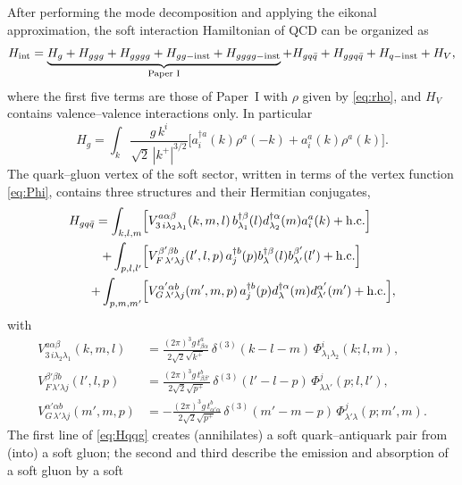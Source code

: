 \documentclass[11pt,a4paper]{article}
\numberwithin{equation}{section}
\newcommand{\dg}{\dagger}
\newcommand{\dthree}{\delta^{(3)}}
\newcommand{\Ph}{\Phi}
\begin{document}
After performing the mode decomposition and applying the eikonal approximation, the soft
interaction Hamiltonian of QCD can be organized as
\begin{equation}
H_{\rm int}=\underbrace{H_{g}+H_{ggg}+H_{gggg}+H_{gg-{\rm inst}}+H_{gggg-{\rm inst}}}_{\text{Paper~I}}
+H_{gq\bar q}+H_{ggq\bar q}+H_{q-{\rm inst}}+H_{V},
\label{eq:Hint}
\end{equation}
where the first five terms are those of Paper~I with $\rho$ given by \eqref{eq:rho}, and $H_{V}$
contains valence--valence interactions only. In particular
\begin{equation}
H_{g}=\int_{k}\frac{g\,k^{i}}{\sqrt2\,|k^{+}|^{3/2}}
\Big[a^{\dg a}_{i}(k)\rho^{a}(-k)+a^{a}_{i}(k)\rho^{a}(k)\Big].
\label{eq:Hg}
\end{equation}
The quark--gluon vertex of the soft sector, written in terms of the vertex function
\eqref{eq:Phi}, contains three structures and their Hermitian conjugates,
\begin{align}
H_{gq\bar q}=\int_{k,l,m}&\Big[V^{a\alpha\beta}_{3\,i\lambda_{2}\lambda_{1}}(k,m,l)\,
b^{\dg\beta}_{\lambda_{1}}(l)d^{\dg\alpha}_{\lambda_{2}}(m)a^{a}_{i}(k)+{\rm h.c.}\Big]
\nonumber\\
+\int_{p,l,l'}&\Big[V^{\beta'\beta b}_{F\,\lambda'\lambda j}(l',l,p)\,
a^{\dg b}_{j}(p)b^{\dg\beta}_{\lambda}(l)b^{\beta'}_{\lambda'}(l')+{\rm h.c.}\Big]
\nonumber\\
+\int_{p,m,m'}&\Big[V^{\alpha'\alpha b}_{G\,\lambda'\lambda j}(m',m,p)\,
a^{\dg b}_{j}(p)d^{\dg\alpha}_{\lambda}(m)d^{\alpha'}_{\lambda'}(m')+{\rm h.c.}\Big],
\label{eq:Hqqg}
\end{align}
with
\begin{align}
V^{a\alpha\beta}_{3\,i\lambda_{2}\lambda_{1}}(k,m,l)&=\frac{(2\pi)^{3}g\,t^{a}_{\beta\alpha}}{2\sqrt2\sqrt{k^{+}}}\,
\dthree(k-l-m)\,\Ph^{i}_{\lambda_{1}\lambda_{2}}(k;l,m),
\label{eq:V3}\\
V^{\beta'\beta b}_{F\,\lambda'\lambda j}(l',l,p)&=\frac{(2\pi)^{3}g\,t^{b}_{\beta\beta'}}{2\sqrt2\sqrt{p^{+}}}\,
\dthree(l'-l-p)\,\Ph^{j}_{\lambda\lambda'}(p;l,l'),
\label{eq:VF}\\
V^{\alpha'\alpha b}_{G\,\lambda'\lambda j}(m',m,p)&=-\frac{(2\pi)^{3}g\,t^{b}_{\alpha'\alpha}}{2\sqrt2\sqrt{p^{+}}}\,
\dthree(m'-m-p)\,\Ph^{j}_{\lambda'\lambda}(p;m',m).
\label{eq:VG}
\end{align}
The first line of \eqref{eq:Hqqg} creates (annihilates) a soft quark--antiquark pair from (into) a
soft gluon; the second and third describe the emission and absorption of a soft gluon by a soft
\end{document}
